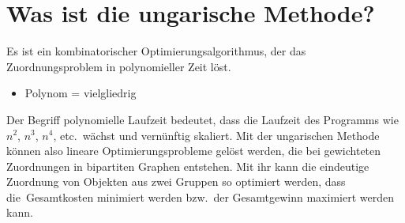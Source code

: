 %
%
%
\section{Was ist die ungarische Methode?
\label{munkres:section:teil1}}
Es ist ein kombinatorischer Optimierungsalgorithmus, der das Zuordnungsproblem
in polynomieller Zeit löst.
\begin{itemize}
\item
Polynom = vielgliedrig
\end{itemize}
Der Begriff polynomielle Laufzeit bedeutet, dass die Laufzeit des Programms
wie $n^2$, $n^3$, $n^4$, etc.~wächst und vernünftig skaliert.
Mit der ungarischen Methode können also lineare Optimierungsprobleme gelöst
werden, die bei gewichteten Zuordnungen in bipartiten Graphen entstehen.
Mit ihr kann die eindeutige Zuordnung von Objekten aus zwei Gruppen so
optimiert werden, dass die Gesamtkosten minimiert werden bzw.~der
Gesamtgewinn maximiert werden kann. 
